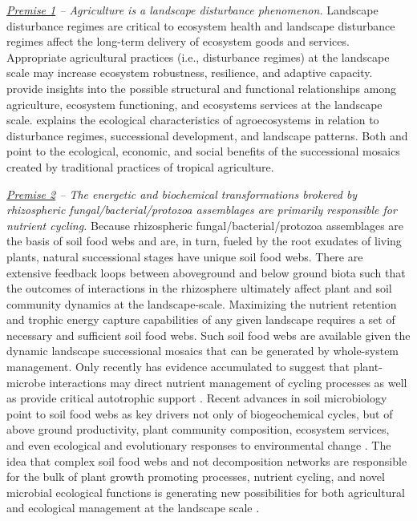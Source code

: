 \documentclass[12pt, letterpaper]{article}
\begin{document}
\textit{\underline{Premise 1} -- Agriculture is a landscape disturbance phenomenon.} Landscape disturbance regimes are critical to ecosystem health and landscape disturbance regimes affect the long-term delivery of ecosystem goods and services. Appropriate agricultural practices (i.e., disturbance regimes) at the landscape scale may increase ecosystem robustness, resilience, and adaptive capacity. \citet{swift_biodiversity_2004} provide insights into the possible structural and functional relationships among agriculture, ecosystem functioning, and ecosystems services at the landscape scale. \citet{gliessman_agroecology:_2015} explains the ecological characteristics of agroecosystems in relation to disturbance regimes, successional development, and landscape patterns.  Both \citet{swift_biodiversity_2004} and \citet{gliessman_agroecology:_2015} point to the ecological, economic, and social benefits of the successional mosaics created by traditional practices of tropical agriculture.

\textit{\underline{Premise 2} -- The energetic and biochemical transformations brokered by rhizospheric fungal/bacterial/protozoa assemblages are primarily responsible for nutrient cycling.} Because rhizospheric fungal/bacterial/protozoa assemblages are the basis of soil food webs and are, in turn, fueled by the root exudates of living plants, natural successional stages have unique soil food webs. There are extensive feedback loops between aboveground and below ground biota such that the outcomes of interactions in the rhizosphere ultimately affect plant and soil community dynamics at the landscape-scale. Maximizing the nutrient retention and trophic energy capture capabilities of any given landscape requires a set of necessary and sufficient soil food webs. Such soil food webs are available given the dynamic landscape successional mosaics that can be generated by whole-system management. Only recently has evidence accumulated to suggest that plant-microbe interactions may direct nutrient management of cycling processes as well as provide critical autotrophic support \citep{ingham_interactions_1985, bais_role_2006}. Recent advances in soil microbiology point to soil food webs as key drivers not only of biogeochemical cycles, but of above ground productivity, plant community composition, ecosystem services, and even ecological and evolutionary responses to environmental change \citep{bardgett_belowground_2014, sackett_linking_2010, lehman_soil_2015}. The idea that complex soil food webs and not decomposition networks are responsible for the bulk of plant growth promoting processes, nutrient cycling, and novel microbial ecological functions is generating new possibilities for both agricultural and ecological management at the landscape scale \citep{prosser_role_2007, smith_plant_2009, pedraza_plant_2009, de_vries_soil_2013, hedlund_trophic_2004, holtkamp_soil_2008, minoshima_soil_2007, rygiewicz_soil_2010, wardle_how_1999}.
\end{document}
